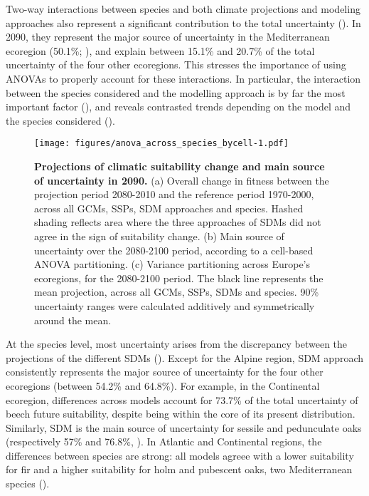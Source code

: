 \documentclass[letterpaper,8pt]{extarticle}  %
\begin{document}
\begin{doublespacing}
\begin{linenumbers}
Two-way interactions between species and both climate projections and modeling approaches also represent a significant contribution to the total uncertainty (). In 2090, they represent the major source of uncertainty in the Mediterranean ecoregion  (50.1\%; ), and explain between 15.1\% and 20.7\% of the total uncertainty of the four other ecoregions. This stresses the importance of using ANOVAs to properly account for these interactions. In particular, the interaction between the species considered and the modelling approach is by far the most important factor (), and reveals contrasted trends depending on the model and the species considered (). 

\begin{figure}[hp]
\centering
\begin{subcaptiongroup}
\label{fig:anova2090A} 
\label{fig:anova2090B}
\label{fig:anova2090C}
\end{subcaptiongroup}
\texttt{[image: figures/anova\_across\_species\_bycell-1.pdf]}
\caption{\textbf{Projections of climatic suitability change and main source of uncertainty in 2090.} (a) Overall change in fitness between the projection period 2080-2010 and the reference period 1970-2000, across all GCMs, SSPs, SDM approaches and species. Hashed shading reflects area where the three approaches of SDMs did not agree in the sign of suitability change. (b) Main source of uncertainty over the 2080-2100 period, according to a cell-based ANOVA partitioning. (c) Variance partitioning across Europe's ecoregions, for the 2080-2100 period. The black line represents the mean projection, across all GCMs, SSPs, SDMs and species. 90\% uncertainty ranges were calculated additively and symmetrically around the mean.}
\label{fig:anova2090}
\end{figure}

At the species level, most uncertainty arises from the discrepancy between the projections of the different SDMs (). Except for the Alpine region, SDM approach consistently represents the major source of uncertainty for the four other ecoregions (between 54.2\% and 64.8\%). For example, in the Continental ecoregion, differences across models account for 73.7\% of the total uncertainty of beech future suitability, despite being within the core of its present distribution. Similarly, SDM is the main source of uncertainty for sessile and pedunculate oaks (respectively 57\% and 76.8\%, ). In Atlantic and Continental regions, the differences between species are strong: all models agreee with a lower suitability for fir and a higher suitability for holm and pubescent oaks, two Mediterranean species (). 


\end{linenumbers}
\end{doublespacing}
\end{document}
